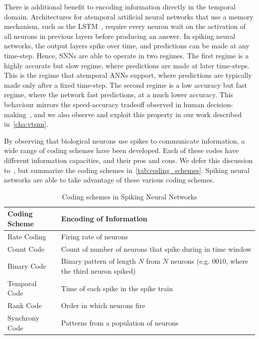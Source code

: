 \documentclass[fyp]{socreport}
\begin{document}
There is additional benefit to encoding information directly in the temporal
domain. Architectures for atemporal artificial neural networks that use a memory
mechanism, such as the LSTM~\cite{hochreiter1997long}, require every neuron wait
on the activation of all neurons in previous layers before producing an answer.
In spiking neural networks, the output layers spike over time, and predictions
can be made at any time-step. Hence, SNNs are able to operate in two regimes.
The first regime is a highly accurate but slow regime, where predictions are
made at later time-steps. This is the regime that atemporal ANNs support, where
predictions are typically made only after a fixed time-step. The second regime
is a low accuracy but fast regime, where the network fast predictions, at a much
lower accuracy. This behaviour mirrors the speed-accuracy tradeoff observed in
human decision-making~\cite{comsa19_tempor_codin_spikin_neural_networ}, and we
also observe and exploit this property in our work described
in~\autoref{cha:vtsnn}.

By observing that biological neurons use spikes to communicate information, a
wide range of coding schemes have been developed. Each of these codes have
different information capacities, and their pros and cons. We defer this
discussion to~\cite{thorpe2001spike}, but summarize the coding schemes
in~\autoref{tab:coding_schemes}. Spiking neural networks are able to take
advantage of these various coding schemes.

\begin{table}
  \centering
  \small
  \begin{tabular}{ll}
    \toprule
    \textbf{Coding Scheme} & \textbf{Encoding of Information} \\
    \midrule
    Rate Coding & Firing rate of neurons \\
    Count Code & Count of number of neurons that spike during in time window \\
    Binary Code & Binary pattern of length $N$ from $N$ neurons (e.g. $0010$,
                  where the third neuron spiked) \\
    Temporal Code & Time of each spike in the spike
                    train \\
    Rank Code & Order in which neurons fire \\
    Synchrony Code & Patterns from a population of neurons \\
    \bottomrule
  \end{tabular}
  \normalsize
  \caption{Coding schemes in Spiking Neural Networks\label{tab:coding_schemes}}
\end{table}
\end{document}
